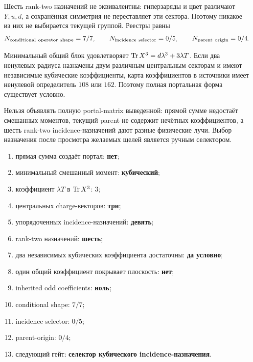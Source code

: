 Шесть rank-two назначений не эквивалентны: гиперзаряды и цвет различают
$Y,u,d$, а сохранённая симметрия не переставляет эти сектора. Поэтому
никакое из них не выбирается текущей группой. Реестры равны
\begin{equation}
 N_{\rm conditional\ operator\ shape}=7/7,
 \qquad N_{\rm incidence\ selector}=0/5,
 \qquad N_{\rm parent\ origin}=0/4.
 \label{eq:v8-two-source-portal-ledgers}
\end{equation}

\begin{theorem}
Минимальный общий блок удовлетворяет $\operatorname{Tr} X^3=d\lambda^3+3\lambda T$.
Если два ненулевых радиуса назначены двум различным центральным секторам и
имеют независимые кубические коэффициенты, карта коэффициентов в источники
имеет ненулевой определитель $108$ или $162$. Поэтому полная портальная
форма существует условно.
\end{theorem}

\begin{nogocriterion}
Нельзя объявлять полную portal-matrix выведенной: прямой сумме недостаёт
смешанных моментов, текущий parent не содержит нечётных коэффициентов, а
шесть rank-two incidence-назначений дают разные физические лучи. Выбор
назначения после просмотра желаемых щелей является ручным селектором.
\end{nogocriterion}

\begin{protocol}\begin{enumerate}
\item прямая сумма создаёт портал: \textbf{нет};
\item минимальный смешанный момент: \textbf{кубический};
\item коэффициент $\lambda T$ в $\operatorname{Tr} X^3$: \textbf{$3$};
\item центральных charge-векторов: \textbf{три};
\item упорядоченных incidence-назначений: \textbf{девять};
\item rank-two назначений: \textbf{шесть};
\item два независимых кубических коэффициента достаточны: \textbf{да условно};
\item один общий коэффициент покрывает плоскость: \textbf{нет};
\item inherited odd coefficients: \textbf{ноль};
\item conditional shape: \textbf{$7/7$};
\item incidence selector: \textbf{$0/5$};
\item parent-origin: \textbf{$0/4$};
\item следующий гейт: \textbf{селектор кубического incidence-назначения}.
\end{enumerate}\end{protocol}


